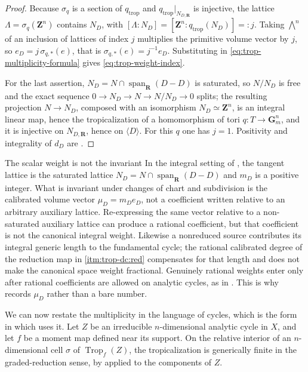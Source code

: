 \begin{proof}
Because $\sigma_q$ is a section of $q_{\mathrm{trop}}$ and
$q_{\mathrm{trop}}|_{N_{D,\mathbf R}}$ is injective, the lattice
$\Lambda=\sigma_q(\mathbf Z^n)$ contains $N_D$, with
$[\Lambda:N_D]=[\mathbf Z^n:q_{\mathrm{trop}}(N_D)]=:j$. Taking
$\bigwedge^n$ of an inclusion of lattices of index $j$ multiplies the
primitive volume vector by $j$, so $e_D=j\,\sigma_{q,*}(e)$, that is
$\sigma_{q,*}(e)=j^{-1}e_D$. Substituting in
\eqref{eq:trop-multiplicity-formula} gives
\eqref{eq:trop-weight-index}.

For the last assertion, $N_D=N\cap\operatorname{span}_{\mathbf R}(D-D)$ is
saturated, so $N/N_D$ is free and the exact sequence
$0\to N_D\to N\to N/N_D\to0$ splits; the resulting projection $N\to N_D$,
composed with an isomorphism $N_D\simeq\mathbf Z^n$, is an integral linear
map, hence the tropicalization of a homomorphism of tori
$q:T\to\mathbf G_m^n$, and it is injective on $N_{D,\mathbf R}$, hence on
$\langle D\rangle$. For this $q$ one has $j=1$. Positivity and integrality
of $d_D$ are .
\end{proof}

\begin{warning}{The scalar weight is not the invariant}
In the integral setting of , the tangent
lattice is the saturated lattice
$N_D=N\cap\operatorname{span}_{\mathbf R}(D-D)$ and $m_D$ is a positive
integer. What is invariant under changes of chart and subdivision is the
calibrated volume vector $\mu_D=m_De_D$, not a coefficient written relative
to an arbitrary auxiliary lattice. Re-expressing the same vector relative
to a non-saturated auxiliary lattice can produce a rational coefficient,
but that coefficient is not the canonical integral weight. Likewise a
nonreduced source contributes its integral generic length to the fundamental
cycle; the rational calibrated degree of the reduction map in
 \cref{itm:trop-dc:red} compensates for
that length and does not make the canonical space weight fractional.
Genuinely rational weights enter only after rational coefficients are
allowed on analytic cycles, as in . This is why
 records $\mu_D$ rather than a bare number.
\end{warning}

We can now restate the multiplicity in the language of cycles, which is the
form in which  uses it. Let $Z$ be an irreducible
$n$-dimensional analytic cycle in $X$, and let $f$ be a moment map defined
near its support. On the relative interior of an
$n$-dimensional cell $\sigma$ of $\operatorname{Trop}_f(Z)$, the
tropicalization is generically finite in the graded-reduction sense, by
 applied to the components of $Z$.

